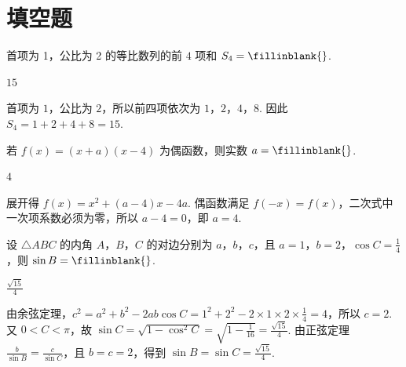 \section{填空题}

\begin{problem}
首项为 1，公比为 2 的等比数列的前 \(4\) 项和 \(S_{4}=\fillinblank{}\).

\begin{answer}
\(15\)
\end{answer}

\begin{solution}
首项为 \(1\)，公比为 \(2\)，所以前四项依次为 \(1\)，\(2\)，\(4\)，\(8\). 因此 \(S_4=1+2+4+8=15\).
\end{solution}
\end{problem}

\begin{problem}
若 \(f(x)=(x+a)(x-4)\) 为偶函数，则实数 \(a=\fillinblank{}\).

\begin{answer}
\(4\)
\end{answer}

\begin{solution}
展开得 \(f(x)=x^2+(a-4)x-4a\). 偶函数满足 \(f(-x)=f(x)\)，二次式中一次项系数必须为零，所以 \(a-4=0\)，即 \(a=4\).
\end{solution}
\end{problem}

\begin{problem}
设 \(\triangle ABC\) 的内角 \(A\)，\(B\)，\(C\) 的对边分别为 \(a\)，\(b\)，\(c\)，且 \(a=1\)，\(b=2\)，\(\cos C=\frac{1}{4}\)，则 \(\sin B=\fillinblank{}\).

\begin{answer}
\(\frac{\sqrt{15}}{4}\)
\end{answer}

\begin{solution}
由余弦定理，\(c^2=a^2+b^2-2ab\cos C=1^2+2^2-2\times1\times2\times\frac14=4\)，所以 \(c=2\). 又 \(0<C<\pi\)，故 \(\sin C=\sqrt{1-\cos^2C}=\sqrt{1-\frac1{16}}=\frac{\sqrt{15}}4\). 由正弦定理 \(\frac{b}{\sin B}=\frac{c}{\sin C}\)，且 \(b=c=2\)，得到 \(\sin B=\sin C=\frac{\sqrt{15}}4\).
\end{solution}
\end{problem}

